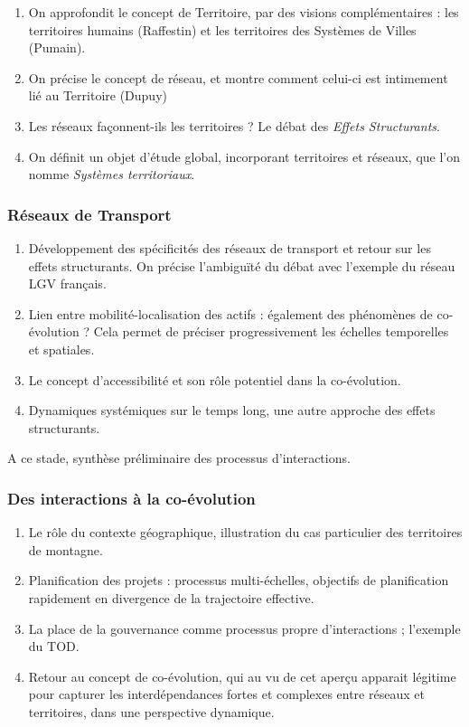 \begin{enumerate}
	\item On approfondit le concept de Territoire, par des visions complémentaires : les territoires humains (Raffestin) et les territoires des Systèmes de Villes (Pumain).
	\item On précise le concept de réseau, et montre comment celui-ci est intimement lié au Territoire (Dupuy)
	\item Les réseaux façonnent-ils les territoires ? Le débat des \emph{Effets Structurants}.
	\item On définit un objet d'étude global, incorporant territoires et réseaux, que l'on nomme \emph{Systèmes territoriaux}.
\end{enumerate}

\subsubsection{Réseaux de Transport}



\begin{enumerate}
	\item Développement des spécificités des réseaux de transport et retour sur les effets structurants. On précise l'ambiguïté du débat avec l'exemple du réseau LGV français.
	\item Lien entre mobilité-localisation des actifs : également des phénomènes de co-évolution ? Cela permet de préciser progressivement les échelles temporelles et spatiales.
	\item Le concept d'accessibilité et son rôle potentiel dans la co-évolution.
	\item Dynamiques systémiques sur le temps long, une autre approche des effets structurants.
\end{enumerate}

A ce stade, synthèse préliminaire des processus d'interactions. 


\subsubsection{Des interactions à la co-évolution}


\begin{enumerate}
	\item Le rôle du contexte géographique, illustration du cas particulier des territoires de montagne.
	\item Planification des projets : processus multi-échelles, objectifs de planification rapidement en divergence de la trajectoire effective.
	\item La place de la gouvernance comme processus propre d'interactions ; l'exemple du TOD.
	\item Retour au concept de co-évolution, qui au vu de cet aperçu apparait légitime pour capturer les interdépendances fortes et complexes entre réseaux et territoires, dans une perspective dynamique.
\end{enumerate}



